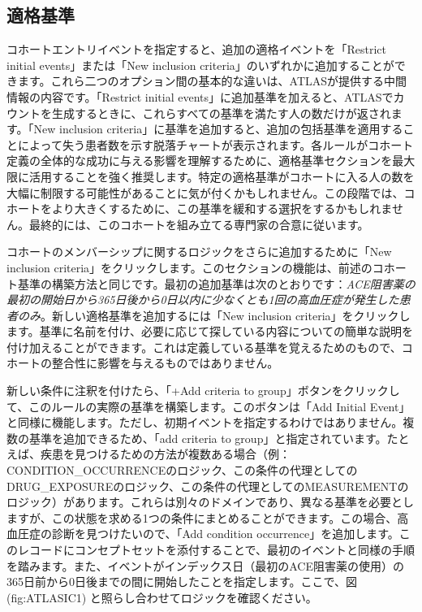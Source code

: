 \documentclass[
  11pt]{book}
\theoremstyle{definition}
\theoremstyle{definition}
\theoremstyle{definition}
\theoremstyle{definition}
\theoremstyle{remark}
\begin{document}
\subsection{適格基準}\label{ux9069ux683cux57faux6e96}

コホートエントリイベントを指定すると、追加の適格イベントを「Restrict initial events」または「New inclusion criteria」のいずれかに追加することができます。これら二つのオプション間の基本的な違いは、ATLASが提供する中間情報の内容です。「Restrict initial events」に追加基準を加えると、ATLASでカウントを生成するときに、これらすべての基準を満たす人の数だけが返されます。「New inclusion criteria」に基準を追加すると、追加の包括基準を適用することによって失う患者数を示す脱落チャートが表示されます。各ルールがコホート定義の全体的な成功に与える影響を理解するために、適格基準セクションを最大限に活用することを強く推奨します。特定の適格基準がコホートに入る人の数を大幅に制限する可能性があることに気が付くかもしれません。この段階では、コホートをより大きくするために、この基準を緩和する選択をするかもしれません。最終的には、このコホートを組み立てる専門家の合意に従います。

コホートのメンバーシップに関するロジックをさらに追加するために「New inclusion criteria」をクリックします。このセクションの機能は、前述のコホート基準の構築方法と同じです。最初の追加基準は次のとおりです：\emph{ACE阻害薬の最初の開始日から365日後から0日以内に少なくとも1回の高血圧症が発生した患者のみ}。新しい適格基準を追加するには「New inclusion criteria」をクリックします。基準に名前を付け、必要に応じて探している内容についての簡単な説明を付け加えることができます。これは定義している基準を覚えるためのもので、コホートの整合性に影響を与えるものではありません。

新しい条件に注釈を付けたら、「+Add criteria to group」ボタンをクリックして、このルールの実際の基準を構築します。このボタンは「Add Initial Event」と同様に機能します。ただし、初期イベントを指定するわけではありません。複数の基準を追加できるため、「add criteria to group」と指定されています。たとえば、疾患を見つけるための方法が複数ある場合（例：CONDITION\_OCCURRENCEのロジック、この条件の代理としてのDRUG\_EXPOSUREのロジック、この条件の代理としてのMEASUREMENTのロジック）があります。これらは別々のドメインであり、異なる基準を必要としますが、この状態を求める1つの条件にまとめることができます。この場合、高血圧症の診断を見つけたいので、「Add condition occurrence」を追加します。このレコードにコンセプトセットを添付することで、最初のイベントと同様の手順を踏みます。また、イベントがインデックス日（最初のACE阻害薬の使用）の365日前から0日後までの間に開始したことを指定します。ここで、図 \citet{ref}(fig:ATLASIC1) と照らし合わせてロジックを確認ください。
\end{document}
